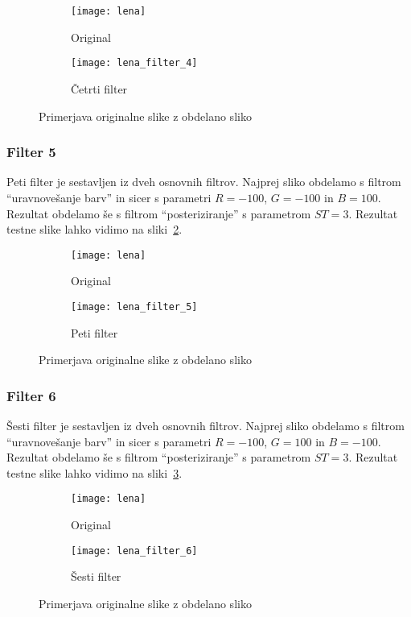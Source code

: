 \begin{figure}[!ht]
    \centering
    \begin{subfigure}[b]{0.4\textwidth}
        \texttt{[image: lena]}
        \caption{Original}
    \end{subfigure}
    \begin{subfigure}[b]{0.4\textwidth}
        \texttt{[image: lena\_filter\_4]}
        \caption{Četrti filter}
    \end{subfigure}
    \caption{Primerjava originalne slike z obdelano sliko}
    \label{fig:lena_filter_4}
\end{figure}


\subsubsection*{Filter 5}
Peti filter je sestavljen iz dveh osnovnih filtrov. Najprej sliko obdelamo s
filtrom ``uravnovešanje barv'' in sicer s parametri $R = -100$, $G = -100$ in
$B = 100$. Rezultat obdelamo še s filtrom ``posteriziranje'' s parametrom
$ST = 3$. Rezultat testne slike lahko vidimo na sliki~\ref{fig:lena_filter_5}.

\begin{figure}[!ht]
    \centering
    \begin{subfigure}[b]{0.4\textwidth}
        \texttt{[image: lena]}
        \caption{Original}
    \end{subfigure}
    \begin{subfigure}[b]{0.4\textwidth}
        \texttt{[image: lena\_filter\_5]}
        \caption{Peti filter}
    \end{subfigure}
    \caption{Primerjava originalne slike z obdelano sliko}
    \label{fig:lena_filter_5}
\end{figure}


\subsubsection*{Filter 6}
Šesti filter je sestavljen iz dveh osnovnih filtrov. Najprej sliko obdelamo s
filtrom ``uravnovešanje barv'' in sicer s parametri $R = -100$, $G = 100$ in
$B = -100$. Rezultat obdelamo še s filtrom ``posteriziranje'' s parametrom
$ST = 3$. Rezultat testne slike lahko vidimo na sliki~\ref{fig:lena_filter_6}.

\begin{figure}[!ht]
    \centering
    \begin{subfigure}[b]{0.4\textwidth}
        \texttt{[image: lena]}
        \caption{Original}
    \end{subfigure}
    \begin{subfigure}[b]{0.4\textwidth}
        \texttt{[image: lena\_filter\_6]}
        \caption{Šesti filter}
    \end{subfigure}
    \caption{Primerjava originalne slike z obdelano sliko}
    \label{fig:lena_filter_6}
\end{figure}


